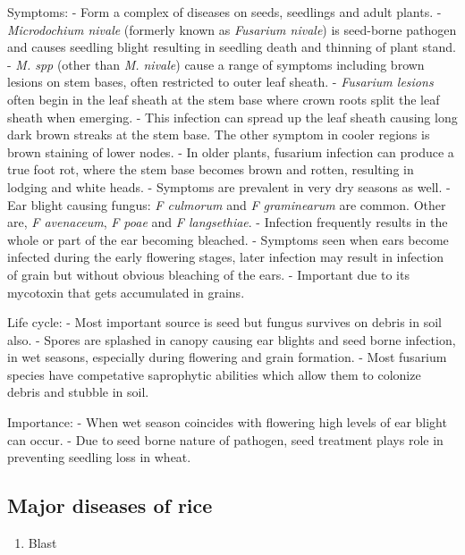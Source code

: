 \documentclass[
]{book}
\providecommand{\tightlist}{%
  \setlength{\itemsep}{0pt}\setlength{\parskip}{0pt}}
\begin{document}
Symptoms:
- Form a complex of diseases on seeds, seedlings and adult plants.
- \emph{Microdochium nivale} (formerly known as \emph{Fusarium nivale}) is seed-borne pathogen and causes seedling blight resulting in seedling death and thinning of plant stand.
- \emph{M. spp} (other than \emph{M. nivale}) cause a range of symptoms including brown lesions on stem bases, often restricted to outer leaf sheath.
- \emph{Fusarium lesions} often begin in the leaf sheath at the stem base where crown roots split the leaf sheath when emerging.
- This infection can spread up the leaf sheath causing long dark brown streaks at the stem base. The other symptom in cooler regions is brown staining of lower nodes.
- In older plants, fusarium infection can produce a true foot rot, where the stem base becomes brown and rotten, resulting in lodging and white heads.
- Symptoms are prevalent in very dry seasons as well.
- Ear blight causing fungus: \emph{F culmorum} and \emph{F graminearum} are common. Other are, \emph{F avenaceum}, \emph{F poae} and \emph{F langsethiae}.
- Infection frequently results in the whole or part of the ear becoming bleached.
- Symptoms seen when ears become infected during the early flowering stages, later infection may result in infection of grain but without obvious bleaching of the ears.
- Important due to its mycotoxin that gets accumulated in grains.

Life cycle:
- Most important source is seed but fungus survives on debris in soil also.
- Spores are splashed in canopy causing ear blights and seed borne infection, in wet seasons, especially during flowering and grain formation.
- Most fusarium species have competative saprophytic abilities which allow them to colonize debris and stubble in soil.

Importance:
- When wet season coincides with flowering high levels of ear blight can occur.
- Due to seed borne nature of pathogen, seed treatment plays role in preventing seedling loss in wheat.

\hypertarget{major-diseases-of-rice}{%
\subsection{Major diseases of rice}\label{major-diseases-of-rice}}

\begin{enumerate}
\def\labelenumi{\arabic{enumi}.}
\tightlist
\item
  Blast
\end{enumerate}
\end{document}
